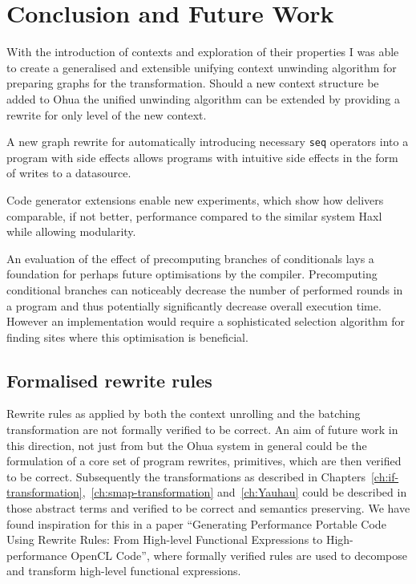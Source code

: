 \chapter{Conclusion and Future Work}

\label{ch:future-work}

With the introduction of contexts and exploration of their properties I was able to create a generalised and extensible unifying context unwinding algorithm for preparing graphs for the \yauhau{} transformation.
Should a new context structure be added to Ohua the unified unwinding algorithm can be extended by providing a rewrite for only level of the new context.

A new graph rewrite for automatically introducing necessary \texttt{seq} operators into a program with side effects allows \yauhau{} programs with intuitive side effects in the form of writes to a datasource.

Code generator extensions enable new experiments, which show how \yauhau{} delivers comparable, if not better, performance compared to the similar system Haxl while allowing modularity.

An evaluation of the effect of precomputing branches of conditionals lays a foundation for perhaps future optimisations by the compiler.
Precomputing conditional branches can noticeably decrease the number of performed rounds in a program and thus potentially significantly decrease overall execution time.
However an implementation would require a sophisticated selection algorithm for finding sites where this optimisation is beneficial.


\section{Formalised rewrite rules}

Rewrite rules as applied by both the context unrolling and the batching transformation are not formally verified to be correct.
An aim of future work in this direction, not just from \yauhau{} but the Ohua system in general could be the formulation of a core set of program rewrites, primitives, which are then verified to be correct.
Subsequently the transformations as described in Chapters~\ref{ch:if-transformation},~\ref{ch:smap-transformation} and~\ref{ch:Yauhau} could be described in those abstract terms and verified to be correct and semantics preserving.
We have found inspiration for this in a paper ``Generating Performance Portable Code Using Rewrite Rules: From High-level Functional Expressions to High-performance OpenCL Code''\cite{Steuwer:2015:GPP:2858949.2784754}, where formally verified rules are used to decompose and transform high-level functional expressions.

